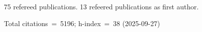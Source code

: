 75 refereed publications. 13 refeered publications as first author.

Total citations~=~5196; h-index~=~38 (2025-09-27)